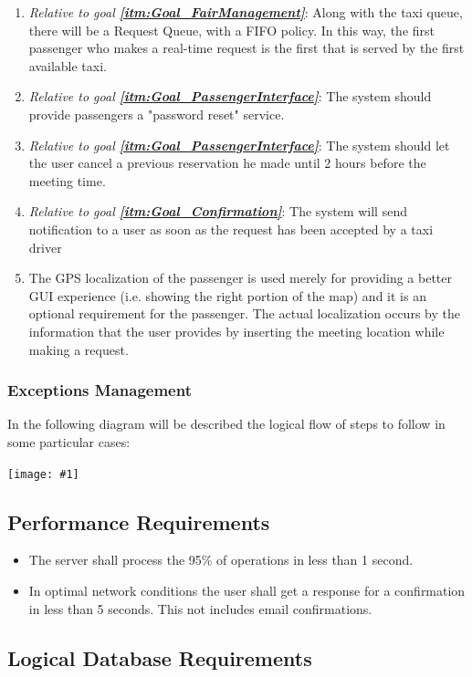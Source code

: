 \documentclass[11pt, a4paper,titlepage]{article}
\newcommand{\image}[1]{
	\begin{center}
		\noindent \texttt{[image: \#1]}
	\end{center}
	}
\newcommand{\linkitm}[1]{\underline{\textbf{\ref{#1}}}}
\begin{document}
\begin{enumerate}
		\item \textit{Relative to goal \linkitm{itm:Goal_FairManagement}}: Along with the taxi queue, there will be a Request Queue, with a FIFO policy. In this way, the first passenger who makes a real-time request is the first that is served by the first available taxi. 
		\item \textit{Relative to goal \linkitm{itm:Goal_PassengerInterface}}: The system should provide passengers a "password reset" service.
		\item \textit{Relative to goal \linkitm{itm:Goal_PassengerInterface}}: The system should let the user cancel a previous reservation he made until 2 hours before the meeting time.
		\item \textit{Relative to goal \linkitm{itm:Goal_Confirmation}}: The system will send notification to a user as soon as the request has been accepted by a taxi driver
		\item The GPS localization of the passenger is used merely for providing a better GUI experience (i.e. showing the right portion of the map) and it is an optional requirement for the passenger. The actual localization occurs by the information that the user provides by inserting the meeting location while making a request.	
	\end{enumerate}

	\subsubsection{Exceptions Management}
		In the following diagram will be described the logical flow of steps to follow in some particular cases: \newline
		\image{schema_exceptions.png}
\subsection{Performance Requirements} %
\begin{itemize}
	\item The server shall process the 95\% of operations in less than 1 second.
	\item In optimal network conditions the user shall get a response for a confirmation in less than 5 seconds. This not includes email confirmations. 
\end{itemize}

\subsection{Logical Database Requirements}
\end{document}

